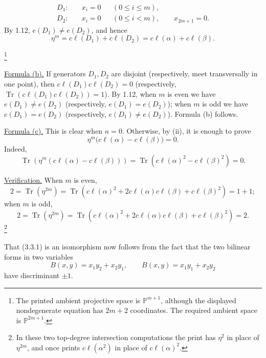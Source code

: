 
\begin{align*}
D_1:&\quad x_i=0 &&(0\leq i\leq m),\\
D_2:&\quad x_i=0 &&(0\leq i<m),\qquad x_{2m+1}=0.
\end{align*}
By 1.12, $e(D_1)\neq e(D_2)$, and hence
\begin{equation*}
\eta^m=c\ell(D_1)+c\ell(D_2)
=c\ell(\alpha)+c\ell(\beta).
\end{equation*}

\footnote{The printed ambient projective space is
$\mathbb P^{m+1}$, although the displayed nondegenerate equation has
$2m+2$ coordinates.  The required ambient space is
$\mathbb P^{2m+1}$.}

\underline{Formula (b).}  If generators $D_1,D_2$ are disjoint
(respectively, meet transversally in one point), then
$c\ell(D_1)c\ell(D_2)=0$ (respectively,
$\operatorname{Tr}(c\ell(D_1)c\ell(D_2))=1$).  By 1.12, when $m$ is
even we have $e(D_1)\neq e(D_2)$ (respectively,
$e(D_1)=e(D_2)$); when $m$ is odd we have $e(D_1)=e(D_2)$
(respectively, $e(D_1)\neq e(D_2)$).  Formula (b) follows.

\underline{Formula (c).}  This is clear when $n=0$.  Otherwise, by
(ii), it is enough to prove
\begin{equation*}
\eta^m\bigl(c\ell(\alpha)-c\ell(\beta)\bigr)=0.
\end{equation*}
Indeed,
\begin{equation*}
\operatorname{Tr}\!\left(
\eta^m(c\ell(\alpha)-c\ell(\beta))\right)
=\operatorname{Tr}\!\left(c\ell(\alpha)^2-c\ell(\beta)^2\right)=0.
\end{equation*}

\underline{Verification.}  When $m$ is even,
\begin{equation*}
2=\operatorname{Tr}(\eta^{2m})
=\operatorname{Tr}\!\left(c\ell(\alpha)^2
+2c\ell(\alpha)c\ell(\beta)+c\ell(\beta)^2\right)=1+1;
\end{equation*}
when $m$ is odd,
\begin{equation*}
2=\operatorname{Tr}(\eta^{2m})
=\operatorname{Tr}\!\left(c\ell(\alpha)^2
+2c\ell(\alpha)c\ell(\beta)+c\ell(\beta)^2\right)=2.
\end{equation*}
\footnote{In these two top-degree intersection computations the print
has $\eta^2$ in place of $\eta^{2m}$, and once prints
$c\ell(\alpha^2)$ in place of $c\ell(\alpha)^2$.}

That (3.3.1) is an isomorphism now follows from the fact that the two
bilinear forms in two variables
\begin{equation*}
B(x,y)=x_1y_2+x_2y_1,
\qquad
B(x,y)=x_1y_1+x_2y_2
\end{equation*}
have discriminant $\pm1$.

